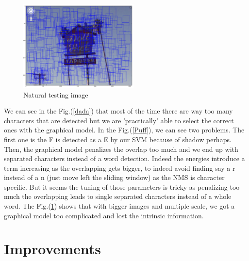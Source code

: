 \documentclass[10pt,a4paper]{article}
\begin{document}
\begin{figure}[ht!c]
\hspace{0.3cm}
\includegraphics[width=6cm]{figures/beerResized.png}%
\caption{Natural testing image}%
\label{beer}
\end{figure}

We can see in the Fig.(\ref{dada}) that most of the time there are way too many characters that are detected but we are 'practically' able to select the correct ones with the graphical model. In the Fig.(\ref{Puff}), we can see two problems. The first one is the F is detected as a E by our SVM because of shadow perhaps. Then, the graphical model penalizes the overlap too much and we end up with separated characters instead of a word detection. Indeed the energies introduce a term increasing as the overlapping gets bigger, to indeed avoid finding say a r instead of a n (just move left the sliding window) as the NMS is character specific. But it seems the tuning of those parameters is tricky as penalizing too much the overlapping leads to single separated characters instead of a whole word. The Fig.(\ref{beer}) shows that with bigger images and multiple scale, we got a graphical model too complicated and lost the intrinsic information.


\section{Improvements}
\end{document}
